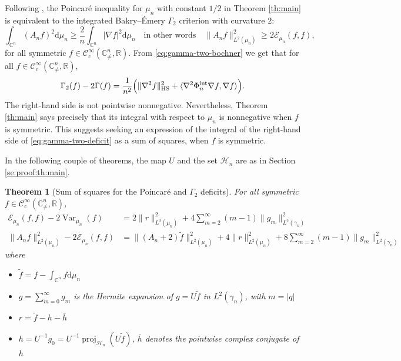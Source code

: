 \documentclass[11pt,reqno]{amsart}
\numberwithin{equation}{section}%
\numberwithin{figure}{section}%
\numberwithin{table}{section}
\theoremstyle{plain}
\newtheorem{theorem}{Theorem}[section]
\theoremstyle{definition}
\begin{document}
Following \cite{BakryGentilLedoux}, the Poincaré inequality for $\mu_n$ with
constant $1/2$ in Theorem \ref{th:main} is equivalent to the integrated
Bakry--Émery $\Gamma_2$ criterion with curvature $2$:
\begin{equation}\label{eq:gamma2int}
  \int_{\mathbb{C}^n}(A_nf)^2\mathrm{d}\mu_n
  \geq\frac{2}{n}\int_{\mathbb{C}^n}|\nabla f|^2\mathrm{d}\mu_n
  \quad\text{in other words}\quad 
  \|A_nf\|_{L^2(\mu_n)}^2\geq2\mathcal{E}_{\mu_n}(f,f),
\end{equation}
for all symmetric $f\in\mathcal{C}^\infty_c(\mathbb{C}^n_{\neq},\mathbb{R})$.
From \eqref{eq:gamma-two-bochner} we get that for all
$f\in\mathcal{C}^\infty_c(\mathbb{C}^n_{\neq},\mathbb{R})$,
\begin{equation}\label{eq:gamma-two-deficit}
  \Gamma_2(f)-2\Gamma(f)
  =\frac{1}{n^2}\Bigl(\|\nabla^2f\|_{\mathrm{HS}}^2
  +\langle\nabla^2\Phi_n^{\mathrm{int}}\nabla f,\nabla f\rangle\Bigr).
\end{equation}
The right-hand side is not pointwise nonnegative. Nevertheless, Theorem
\ref{th:main} says precisely that its integral with respect to $\mu_n$ is
nonnegative when $f$ is symmetric. This suggests seeking an expression of the
integral of the right-hand side of \eqref{eq:gamma-two-deficit} as a sum of
squares, when $f$ is symmetric.

In the following couple of theorems, the map $U$ and the set $\mathcal{H}_n$ are as in Section
\ref{se:proof:th:main}.

\begin{theorem}[Sum of squares for the Poincaré and $\Gamma_2$ deficits]
  \label{th:deficit1}
  For all symmetric $f\in\mathcal{C}^\infty_c(\mathbb{C}^n_{\neq},\mathbb{R})$, 
  \begin{align}
    \mathcal{E}_{\mu_n}(f,f)
    -2\operatorname{Var}_{\mu_n}(f)
    &=2\|r\|_{L^2(\mu_n)}^2
    +4\sum_{m=2}^{\infty}(m-1)\|g_m\|_{L^2(\gamma_n)}^2\label{eq:poincare-deficit-sum-of-squares}\\
    \|A_nf\|_{L^2(\mu_n)}^2-2\mathcal{E}_{\mu_n}(f,f)
    &=
    \|(A_n+2)\widetilde f\|_{L^2(\mu_n)}^2
    +4\|r\|_{L^2(\mu_n)}^2
    +8\sum_{m=2}^{\infty}(m-1)\|g_m\|_{L^2(\gamma_n)}^2\label{eq:integrated-gamma-two-sum-of-squares}
  \end{align}
  where
  \begin{itemize}
  \item $\widetilde f=f-\int_{\mathbb{C}^n}f\mathrm{d}\mu_n$
  \item $g=\sum_{m=0}^\infty g_m$ is the Hermite expansion of
    $g=U\widetilde f$ in $L^2(\gamma_n)$, with $m=|q|$
  \item $r=\widetilde f-h-\overline{h}$
  \item
    $h=U^{-1}g_0=U^{-1}\operatorname{proj}_{\mathcal{H}_n}(U\widetilde{f})$,
    $\overline{h}$ denotes the pointwise complex conjugate of $h$
  \end{itemize}
\end{theorem}
\end{document}
